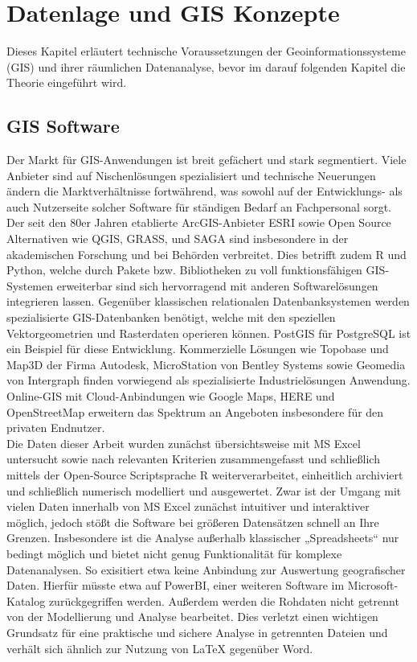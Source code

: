 \chapter{Datenlage und GIS Konzepte}
\label{ch:background} 

Dieses Kapitel erläutert technische Voraussetzungen der Geoinformationssysteme (GIS) und ihrer räumlichen Datenanalyse, 
bevor im darauf folgenden Kapitel die Theorie eingeführt wird.

\section{GIS Software}

Der Markt für GIS-Anwendungen ist breit gefächert und stark segmentiert. 
Viele Anbieter sind auf Nischenlösungen spezialisiert und technische Neuerungen ändern die Marktverhältnisse fortwährend, 
was sowohl auf der Entwicklungs- als auch Nutzerseite solcher Software für ständigen Bedarf an Fachpersonal sorgt. 
Der seit den 80er Jahren etablierte ArcGIS-Anbieter ESRI sowie Open Source Alternativen wie QGIS, GRASS, und SAGA 
sind insbesondere in der akademischen Forschung und bei Behörden verbreitet. Dies betrifft zudem R und Python, welche durch Pakete bzw. Bibliotheken zu voll funktionsfähigen
GIS-Systemen erweiterbar sind sich hervorragend mit anderen Softwarelösungen integrieren lassen. Gegenüber klassischen relationalen Datenbanksystemen werden spezialisierte 
GIS-Datenbanken benötigt, welche mit den speziellen Vektorgeometrien und Rasterdaten operieren können. PostGIS für PostgreSQL ist ein Beispiel für diese Entwicklung.
Kommerzielle Lösungen wie Topobase und Map3D der Firma Autodesk, MicroStation von Bentley Systems sowie Geomedia von Intergraph finden 
vorwiegend als spezialisierte Industrielösungen Anwendung. 
Online-GIS mit Cloud-Anbindungen wie Google Maps, HERE und OpenStreetMap erweitern das Spektrum an Angeboten insbesondere für den privaten Endnutzer.\\

Die Daten dieser Arbeit wurden zunächst übersichtsweise mit MS Excel untersucht sowie nach relevanten Kriterien zusammengefasst und 
schließlich mittels der Open-Source Scriptsprache R weiterverarbeitet, einheitlich archiviert und schließlich numerisch modelliert und ausgewertet. 
Zwar ist der Umgang mit vielen Daten innerhalb von MS Excel zunächst intuitiver und interaktiver möglich, jedoch stößt die Software bei größeren Datensätzen schnell an Ihre Grenzen. 
Insbesondere ist die Analyse außerhalb klassischer „Spreadsheets“ nur bedingt möglich und bietet nicht genug Funktionalität für komplexe Datenanalysen. 
So exisitiert etwa keine Anbindung zur Auswertung geografischer Daten. Hierfür müsste etwa auf PowerBI, einer weiteren Software im Microsoft-Katalog zurückgegriffen werden.
Außerdem werden die Rohdaten nicht getrennt von der Modellierung und Analyse bearbeitet. 
Dies verletzt einen wichtigen Grundsatz für eine praktische und sichere Analyse in getrennten Dateien und verhält sich ähnlich zur Nutzung von LaTeX gegenüber Word.\\

